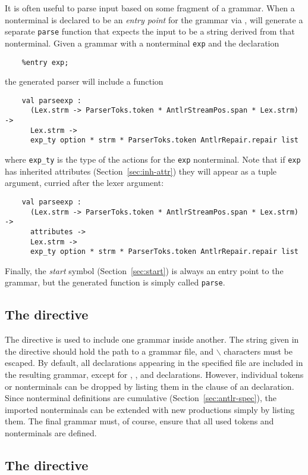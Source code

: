 It is often useful to parse input based on some fragment of a grammar.  When a nonterminal is declared to be an \emph{entry point} for the grammar via , \antlr{} will generate a separate {\tt parse} function that expects the input to be a string derived from that nonterminal.  Given a grammar with a nonterminal {\tt exp} and the declaration
\begin{verbatim}
    %entry exp;
\end{verbatim}
the generated parser will include a function
\begin{verbatim}
    val parseexp :
      (Lex.strm -> ParserToks.token * AntlrStreamPos.span * Lex.strm) -> 
      Lex.strm -> 
      exp_ty option * strm * ParserToks.token AntlrRepair.repair list
\end{verbatim}
where {\tt exp\_ty} is the type of the actions for the {\tt exp} nonterminal.  Note that if {\tt exp} has inherited attributes (Section~\ref{sec:inh-attr}) they will appear as a tuple argument, curried after the lexer argument:
\begin{verbatim}
    val parseexp :
      (Lex.strm -> ParserToks.token * AntlrStreamPos.span * Lex.strm) -> 
      attributes ->
      Lex.strm -> 
      exp_ty option * strm * ParserToks.token AntlrRepair.repair list
\end{verbatim}
Finally, the \emph{start} symbol (Section~\ref{sec:start}) is always an entry point to the grammar, but the generated function is simply called {\tt parse}.

\subsection{The  directive}

The  directive is used to include one grammar inside another.  The string given in the directive should hold the path to a grammar file, and $\backslash$ characters must be escaped.  By default, all declarations appearing in the specified file are included in the resulting grammar, except for , , and  declarations.  However, individual tokens or nonterminals can be dropped by listing them in the  clause of an  declaration.  Since nonterminal definitions are cumulative (Section~\ref{sec:antlr-spec}), the imported nonterminals can be extended with new productions simply by listing them.
The final grammar must, of course, ensure that all used tokens and nonterminals are defined.

\subsection{The  directive}

